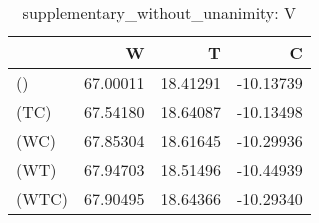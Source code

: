 \begin{table}
\centering
\caption{supplementary_without_unanimity: V}
\begin{tabular}{lrrr}
\toprule
{} &        W &        T &         C \\
\midrule
()    & 67.00011 & 18.41291 & -10.13739 \\
(TC)  & 67.54180 & 18.64087 & -10.13498 \\
(WC)  & 67.85304 & 18.61645 & -10.29936 \\
(WT)  & 67.94703 & 18.51496 & -10.44939 \\
(WTC) & 67.90495 & 18.64366 & -10.29340 \\
\bottomrule
\end{tabular}
\end{table}
